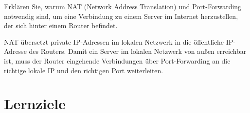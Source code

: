 \begin{myexercise}

    Erklären Sie, warum NAT (Network Address Translation) und Port-Forwarding notwendig sind, um eine Verbindung zu einem Server im Internet herzustellen, der sich hinter einem Router befindet.

    \begin{myanswer}
        NAT übersetzt private IP-Adressen im lokalen Netzwerk in die öffentliche IP-Adresse des Routers. Damit ein Server im lokalen Netzwerk von außen erreichbar ist, muss der Router eingehende Verbindungen über Port-Forwarding an die richtige lokale IP und den richtigen Port weiterleiten.
    \end{myanswer}
\end{myexercise}

\chapter{Lernziele}

